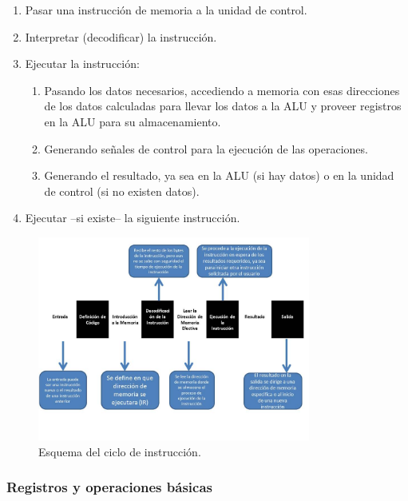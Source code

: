 \documentclass[a4paper, 11pt, titlepage]{article}
\begin{document}
        \begin{enumerate}
            \item Pasar una instrucción de memoria a la unidad de control.
            \item Interpretar (decodificar) la instrucción.
            \item Ejecutar la instrucción:
            \begin{enumerate}
                \item Pasando los datos necesarios, accediendo a memoria con esas direcciones de los datos 
                calculadas para llevar los datos a la ALU y proveer registros en la ALU para su almacenamiento.
                \item Generando señales de control para la ejecución de las operaciones.
                \item Generando el resultado, ya sea en la ALU (si hay datos) o en la unidad de control (si no 
                existen datos).
            \end{enumerate}
            \item Ejecutar --si existe-- la siguiente instrucción.
        \end{enumerate}

        \begin{figure}[htp]
            \centering
            \includegraphics[width=0.8\textwidth]{resources/cicloinstruccion.jpg}
            \caption{Esquema del ciclo de instrucción.}
            \label{cicloinstruccion}
        \end{figure}

        \subsubsection{Registros y operaciones básicas}
\end{document}

